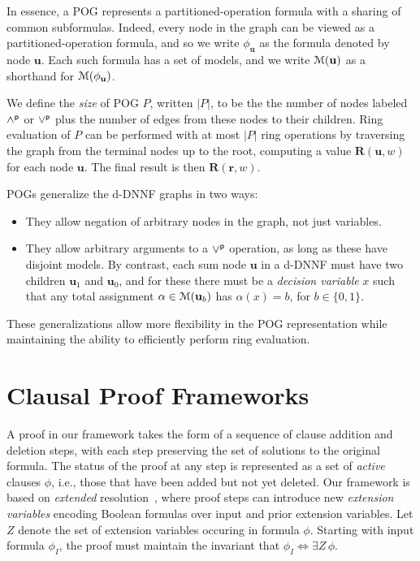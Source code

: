 \documentclass[letterpaper,USenglish,cleveref, autoref, thm-restate]{lipics-v2021}
\newcommand{\pand}{\mathbin{\land^{\sf p}}}
\newcommand{\por}{\mathbin{\lor^{\sf p}}}
\newcommand{\rep}{\textbf{R}}
\newcommand{\ifandonlyif}{\Leftrightarrow}
\newcommand{\assign}{\alpha}
\newcommand{\modelset}{{\cal M}}
\newcommand{\inputformula}{\phi_I}
\newcommand{\makenode}[1]{\mathbf{#1}}
\newcommand{\nodeu}{\makenode{u}}
\newcommand{\noder}{\makenode{r}}
\begin{document}
In essence, a POG represents a partitioned-operation
formula with a sharing of common subformulas.  Indeed, every node in the graph can be viewed as a partitioned-operation formula, and so we write
$\phi_{\nodeu}$ as the formula denoted by node $\nodeu$.
Each such formula has a set of models, and we write $\modelset(\nodeu)$ as a shorthand for $\modelset(\phi_{\nodeu})$.

We define the {\em size} of POG $P$, written $|P|$, to be the
the number of nodes labeled $\pand$ or $\por$ plus the number of edges from these nodes to their children.  Ring
evaluation of $P$ can be performed with at most $|P|$ ring
operations by traversing the graph from the terminal nodes up to
the root, computing a value $\rep(\nodeu, w)$ for each node $\nodeu$.
The final result is then $\rep(\noder, w)$.

POGs generalize the d-DNNF graphs in two ways:
\begin{itemize}
\item They allow negation of arbitrary nodes in the graph, not just
  variables.
\item They allow arbitrary arguments to a $\por$ operation, as long as
  these have disjoint models.  By contrast, each
  sum node $\nodeu$ in a d-DNNF must have two children $\nodeu_1$ and $\nodeu_0$, and for these there must be a {\em decision variable} $x$ such that
  any total assignment $\assign \in  \modelset(\nodeu_b)$ has $\assign(x)=b$, for $b \in \{0,1\}$.
\end{itemize}
  These generalizations allow more flexibility in the POG
  representation while maintaining the ability to efficiently perform ring evaluation.

\section{Clausal Proof Frameworks}

A proof in our framework takes the form of a sequence of clause addition
and deletion steps, with each step preserving the set of solutions to
the original formula.
The status of the proof at any step is represented as
a set of {\em active} clauses $\phi$, i.e., those that
have been added but not yet deleted.
Our framework is based
on {\em extended} resolution~\cite{Tseitin:1983}, where proof
steps can introduce new {\em extension variables} encoding Boolean formulas over input and prior extension variables.
Let $Z$
denote the set of extension variables occuring in formula $\phi$.
Starting with input formula $\inputformula$,
the proof must maintain the invariant that
$\inputformula \ifandonlyif \exists Z\,\phi$.
\end{document}
